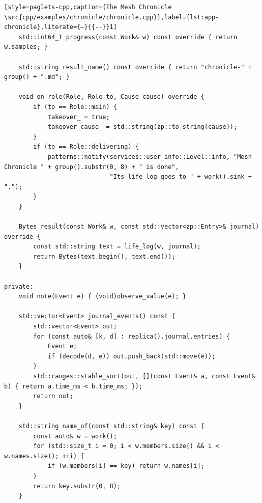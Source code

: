 \begin{lstlisting}[style=paglets-cpp,caption={The Mesh Chronicle \src{cpp/examples/chronicle/chronicle.cpp}},label={lst:app-chronicle},literate={–}{{--}}1]
    std::int64_t progress(const Work& w) const override { return w.samples; }

    std::string result_name() const override { return "chronicle-" + group() + ".md"; }

    void on_role(Role, Role to, Cause cause) override {
        if (to == Role::main) {
            takeover_ = true;
            takeover_cause_ = std::string(zp::to_string(cause));
        }
        if (to == Role::delivering) {
            patterns::notify(services::user_info::Level::info, "Mesh Chronicle " + group().substr(0, 8) + " is done",
                             "Its life log goes to " + work().sink + ".");
        }
    }

    Bytes result(const Work& w, const std::vector<zp::Entry>& journal) override {
        const std::string text = life_log(w, journal);
        return Bytes(text.begin(), text.end());
    }

private:
    void note(Event e) { (void)observe_value(e); }

    std::vector<Event> journal_events() const {
        std::vector<Event> out;
        for (const auto& [k, d] : replica().journal.entries) {
            Event e;
            if (decode(d, e)) out.push_back(std::move(e));
        }
        std::ranges::stable_sort(out, [](const Event& a, const Event& b) { return a.time_ms < b.time_ms; });
        return out;
    }

    std::string name_of(const std::string& key) const {
        const auto& w = work();
        for (std::size_t i = 0; i < w.members.size() && i < w.names.size(); ++i) {
            if (w.members[i] == key) return w.names[i];
        }
        return key.substr(0, 8);
    }


\end{lstlisting}
